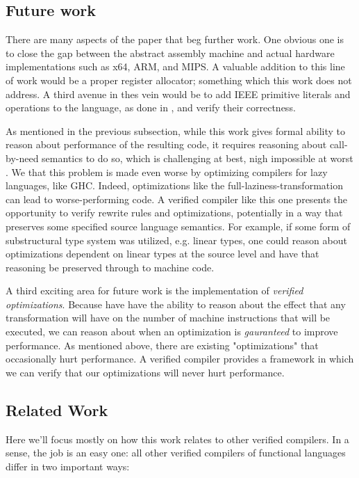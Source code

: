 \subsection{Future work}

There are many aspects of the paper that beg further work. One obvious one is to
close the gap between the abstract assembly machine and actual hardware
implementations such as x64, ARM, and MIPS. A valuable addition to this line of
work would be a proper register allocator; something which this work does not
address. A third avenue in thes vein would be to add IEEE primitive literals and
operations to the language, as done in \cite{?}, and verify their correctness.

As mentioned in the previous subsection, while this work gives formal ability to
reason about performance of the resulting code, it requires reasoning about
call-by-need semantics to do so, which is challenging at best, nigh impossible
at worst \cite{?}. We that this problem is made even worse by optimizing
compilers for lazy languages, like GHC. Indeed, optimizations like the
full-laziness-transformation can lead to worse-performing code. A verified
compiler like this one presents the opportunity to verify rewrite rules and
optimizations, potentially in a way that preserves some specified source
language semantics. For example, if some form of substructural type system was
utilized, e.g. linear types, one could reason about optimizations dependent on
linear types at the source level and have that reasoning be preserved through to
machine code.

A third exciting area for future work is the implementation of \emph{verified
optimizations}. Because have have the ability to reason about the effect that
any transformation will have on the number of machine instructions that will be
executed, we can reason about when an optimization is \emph{gauranteed} to
improve performance. As mentioned above, there are existing "optimizations" that
occasionally hurt performance. A verified compiler provides a framework in which
we can verify that our optimizations will never hurt performance. 


\subsection{Related Work}

Here we'll focus mostly on how this work relates to other verified compilers. In
a sense, the job is an easy one: all other verified compilers of functional
languages differ in two important ways: 

